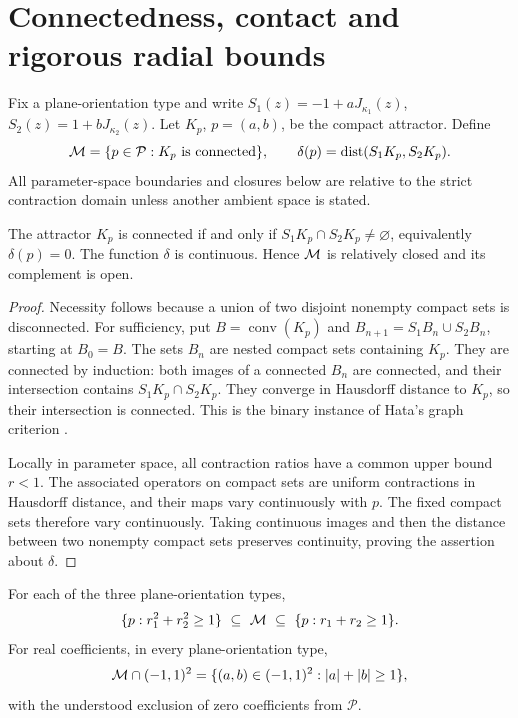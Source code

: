 \section{Connectedness, contact and rigorous radial bounds}
\label{sec:core-connectedness}

Fix a plane-orientation type and write $S_1(z)=-1+aJ_{\kappa_1}(z)$,
$S_2(z)=1+bJ_{\kappa_2}(z)$. Let $K_p$, $p=(a,b)$, be the compact
attractor. Define
\[
\mathcal M=\{p\in\mathcal P:K_p\text{ is connected}\},\qquad
\delta(p)=\operatorname{dist}(S_1K_p,S_2K_p).
\]
All parameter-space boundaries and closures below are relative to
the strict contraction domain unless another ambient space is stated.

\begin{proposition}\label{prop:binary-contact}
The attractor $K_p$ is connected if and only if
$S_1K_p\cap S_2K_p\ne\varnothing$, equivalently $\delta(p)=0$.
The function $\delta$ is continuous. Hence $\mathcal M$ is relatively closed
and its complement is open.
\end{proposition}

\begin{proof}
Necessity follows because a union of two disjoint nonempty compact
sets is disconnected. For sufficiency, put $B=\operatorname{conv}(K_p)$
and $B_{n+1}=S_1B_n\cup S_2B_n$, starting at $B_0=B$.
The sets $B_n$ are nested compact sets containing $K_p$. They are
connected by induction: both images of a connected $B_n$ are
connected, and their intersection contains $S_1K_p\cap S_2K_p$.
They converge in Hausdorff distance to $K_p$, so their intersection
is connected. This is the binary instance of Hata's graph criterion
\cite{Hata1985}.

Locally in parameter space, all contraction ratios have a common
upper bound $r<1$. The associated operators on compact sets are
uniform contractions in Hausdorff distance, and their maps vary
continuously with $p$. The fixed compact sets therefore vary
continuously. Taking continuous images and then the distance between
two nonempty compact sets preserves continuity, proving the assertion
about $\delta$.
\end{proof}

\begin{proposition}\label{prop:radial-bounds}
For each of the three plane-orientation types,
\begin{equation}\label{eq:modulus-bounds}
\{p:r_1^2+r_2^2\ge1\}\ \subseteq\ \mathcal M\ \subseteq\
\{p:r_1+r_2\ge1\}.
\end{equation}
For real coefficients, in every plane-orientation type,
\begin{equation}\label{eq:real-slice}
\mathcal M\cap(-1,1)^2=\{(a,b)\in(-1,1)^2:|a|+|b|\ge1\},
\end{equation}
with the understood exclusion of zero coefficients from $\mathcal P$.
\end{proposition}


